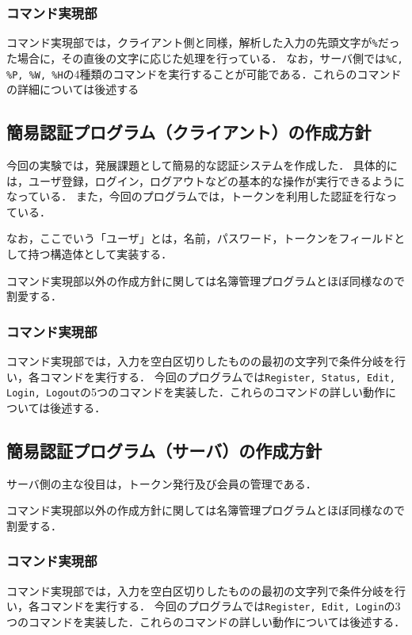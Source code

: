 \documentclass[11pt]{jsarticle}
\begin{document}
\subsubsection{コマンド実現部}
コマンド実現部では，クライアント側と同様，解析した入力の先頭文字が{\tt \%}だった場合に，その直後の文字に応じた処理を行っている．
なお，サーバ側では{\tt \%C, \%P, \%W, \%H}の4種類のコマンドを実行することが可能である．これらのコマンドの詳細については後述する

\subsection{簡易認証プログラム（クライアント）の作成方針}

今回の実験では，発展課題として簡易的な認証システムを作成した．
具体的には，ユーザ登録，ログイン，ログアウトなどの基本的な操作が実行できるようになっている．
また，今回のプログラムでは，トークンを利用した認証を行なっている．

なお，ここでいう「ユーザ」とは，名前，パスワード，トークンをフィールドとして持つ構造体として実装する．

コマンド実現部以外の作成方針に関しては名簿管理プログラムとほぼ同様なので割愛する．

\subsubsection{コマンド実現部}
コマンド実現部では，入力を空白区切りしたものの最初の文字列で条件分岐を行い，各コマンドを実行する．
今回のプログラムでは{\tt Register, Status, Edit, Login, Logout}の5つのコマンドを実装した．これらのコマンドの詳しい動作については後述する．

\subsection{簡易認証プログラム（サーバ）の作成方針}

サーバ側の主な役目は，トークン発行及び会員の管理である．

コマンド実現部以外の作成方針に関しては名簿管理プログラムとほぼ同様なので割愛する．

\subsubsection{コマンド実現部}
コマンド実現部では，入力を空白区切りしたものの最初の文字列で条件分岐を行い，各コマンドを実行する．
今回のプログラムでは{\tt Register, Edit, Login}の3つのコマンドを実装した．これらのコマンドの詳しい動作については後述する．
\end{document}
